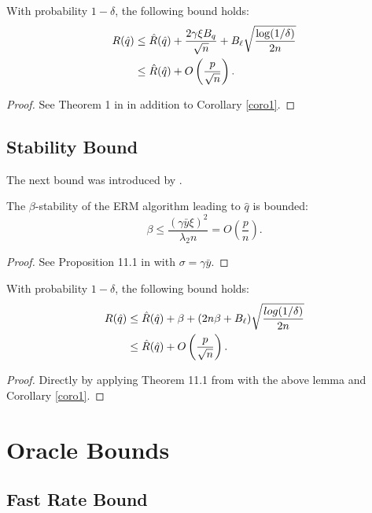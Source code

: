 \documentclass{article}
\begin{document}
\begin{thm}
  \label{thm2}
  With probability $1-\delta$, the following bound holds:
  \begin{align*}
    R(\hat q) &\leq \hat R(\hat q) + \frac{2\gamma\xi B_q}{\sqrt{n}} +
             B_\ell\sqrt{\frac{\log(1/\delta)}{2n}}\\
    &\leq \hat R(\hat q) + O\left(\frac{p}{\sqrt{n}}\right).
  \end{align*}
\end{thm}
\begin{proof}
  See Theorem 1 in \cite{kakade2009complexity} in addition to Corollary \ref{coro1}.
\end{proof}


\subsection{Stability Bound}

The next bound was introduced by \cite{bousquet2002stability}.

\begin{lemma*}
  \label{beta_bound}
  The $\beta$-stability of the ERM algorithm leading to $\hat q$ is bounded:
  \[
    \beta \leq \frac{(\gamma\bar y\xi)^2}{\lambda_2 n} = O\left(\frac{p}{n}\right).
  \]
\end{lemma*}
\begin{proof}
  See Proposition 11.1 in \cite{mohri2012foundations} with $\sigma = \gamma\bar y$. 
\end{proof}

\begin{thm}
  With probability $1-\delta$, the following bound holds:
  \begin{align*}
    R(\hat q) &\leq \hat R(\hat q) + \beta + (2n\beta +
                B_\ell)\sqrt{\frac{log(1/\delta)}{2n}}\\
              &\leq \hat R(\hat q) + O\left(\frac{p}{\sqrt{n}}\right).
  \end{align*}
\end{thm}
\begin{proof}
  Directly by applying Theorem 11.1 from \cite{mohri2012foundations} with the above lemma
  and Corollary \ref{coro1}.
\end{proof}


\section{Oracle Bounds}

\subsection{Fast Rate Bound}
\end{document}
